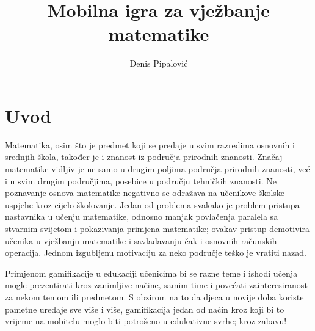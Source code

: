 \documentclass[times, utf8, zavrsni, numeric]{fer}
\begin{document}

\title{Mobilna igra za vježbanje matematike}

\author{Denis Pipalović}

\maketitle



\zahvala{}

\tableofcontents

\chapter{Uvod}
	Matematika, osim što je predmet koji se predaje u svim razredima osnovnih i srednjih škola, također je i znanost iz područja prirodnih znanosti.
Značaj matematike vidljiv je ne samo u drugim poljima područja prirodnih znanosti, već i u svim drugim područjima, posebice u području tehničkih znanosti.
Ne poznavanje osnova matematike negativno se odražava na učenikove školske uspjehe kroz cijelo školovanje. Jedan od problema svakako je problem pristupa nastavnika
 u učenju matematike, odnosno manjak povlačenja paralela sa stvarnim svijetom i pokazivanja primjena matematike; ovakav pristup demotivira učenika u vježbanju matematike
i savladavanju čak i osnovnih računskih operacija. Jednom izgubljenu motivaciju za neko područje teško je vratiti nazad.

Primjenom gamifikacije u edukaciji učenicima bi se razne teme i ishodi učenja mogle prezentirati kroz zanimljive načine, samim time i povećati zainteresiranost za nekom temom 
ili predmetom. S obzirom na to da djeca u novije doba koriste pametne uređaje sve više i više, gamifikacija jedan od način kroz koji bi to vrijeme na mobitelu moglo biti potrošeno
 u edukativne svrhe; kroz zabavu!
\end{document}
